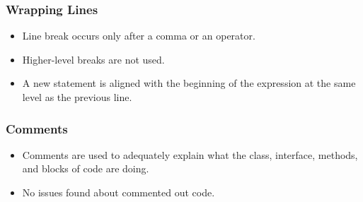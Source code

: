 \subsubsection{Wrapping Lines}
\begin{itemize}
\item Line break occurs only after a comma or an operator. 
\item Higher-level breaks are not used. 
\item A new statement is aligned with the beginning of the expression at the
same level as the previous line.
\end{itemize}


\subsubsection{Comments}
\begin{itemize}
\item Comments are used to adequately explain what the class, interface,
methods, and blocks of code are doing. 
\item No issues found about commented out code. 
\end{itemize}
